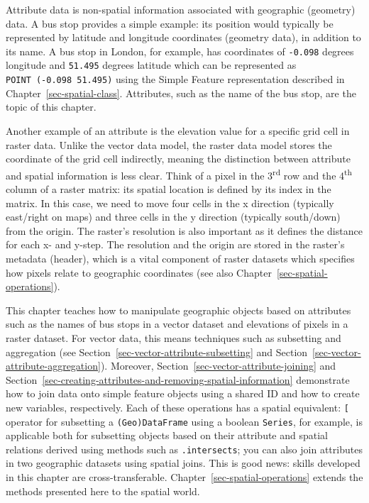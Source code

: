 \documentclass[
  letterpaper,
]{krantz}
\begin{document}
Attribute data is non-spatial information associated with geographic
(geometry) data. A bus stop provides a simple example: its position
would typically be represented by latitude and longitude coordinates
(geometry data), in addition to its name. A bus stop in London, for
example, has coordinates of \texttt{-0.098} degrees longitude and
\texttt{51.495} degrees latitude which can be represented as
\texttt{POINT\ (-0.098\ 51.495)} using the Simple Feature representation
described in Chapter~\ref{sec-spatial-class}. Attributes, such as the
name of the bus stop, are the topic of this chapter.

Another example of an attribute is the elevation value for a specific
grid cell in raster data. Unlike the vector data model, the raster data
model stores the coordinate of the grid cell indirectly, meaning the
distinction between attribute and spatial information is less clear.
Think of a pixel in the 3\textsuperscript{rd} row and the
4\textsuperscript{th} column of a raster matrix: its spatial location is
defined by its index in the matrix. In this case, we need to move four
cells in the x direction (typically east/right on maps) and three cells
in the y direction (typically south/down) from the origin. The raster's
resolution is also important as it defines the distance for each x- and
y-step. The resolution and the origin are stored in the raster's
metadata (header), which is a vital component of raster datasets which
specifies how pixels relate to geographic coordinates (see also
Chapter~\ref{sec-spatial-operations}).

This chapter teaches how to manipulate geographic objects based on
attributes such as the names of bus stops in a vector dataset and
elevations of pixels in a raster dataset. For vector data, this means
techniques such as subsetting and aggregation (see
Section~\ref{sec-vector-attribute-subsetting} and
Section~\ref{sec-vector-attribute-aggregation}). Moreover,
Section~\ref{sec-vector-attribute-joining} and
Section~\ref{sec-creating-attributes-and-removing-spatial-information}
demonstrate how to join data onto simple feature objects using a shared
ID and how to create new variables, respectively. Each of these
operations has a spatial equivalent: \texttt{{[}} operator for
subsetting a \texttt{(Geo)DataFrame} using a boolean \texttt{Series},
for example, is applicable both for subsetting objects based on their
attribute and spatial relations derived using methods such as
\texttt{.intersects}; you can also join attributes in two geographic
datasets using spatial joins. This is good news: skills developed in
this chapter are cross-transferable.
Chapter~\ref{sec-spatial-operations} extends the methods presented here
to the spatial world.
\end{document}
